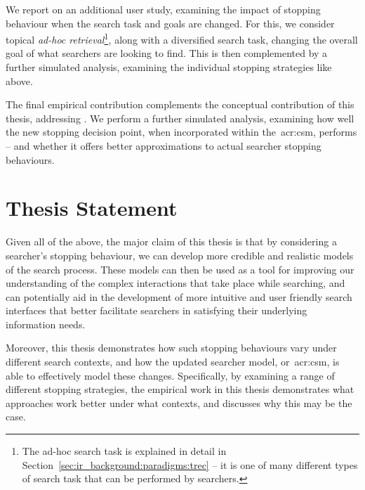 \noindent
{} We report on an additional user study, examining the impact of stopping behaviour when the search task and goals are changed. For this, we consider topical \emph{ad-hoc retrieval}\footnote{The ad-hoc search task is explained in detail in Section~\ref{sec:ir_background:paradigms:trec} -- it is one of many different types of search task that can be performed by searchers.}\emph{,} along with a diversified search task, changing the overall goal of what searchers are looking to find. This is then complemented by a further simulated analysis, examining the individual stopping strategies like above.

 The final empirical contribution complements the conceptual contribution of this thesis, addressing . We perform a further simulated analysis, examining how well the new stopping decision point, when incorporated within the~\gls{acr:csm}, performs -- and whether it offers better approximations to actual searcher stopping behaviours.

\section{Thesis Statement}
Given all of the above, the major claim of this thesis is that by considering a searcher's stopping behaviour, we can develop more credible and realistic models of the search process. These models can then be used as a tool for improving our understanding of the complex interactions that take place while searching, and can potentially aid in the development of more intuitive and user friendly search interfaces that better facilitate searchers in satisfying their underlying information needs.

Moreover, this thesis demonstrates how such stopping behaviours vary under different search contexts, and how the updated searcher model, or~\gls{acr:csm}, is able to effectively model these changes. Specifically, by examining a range of different stopping strategies, the empirical work in this thesis demonstrates what approaches work better under what contexts, and discusses why this may be the case.

%

